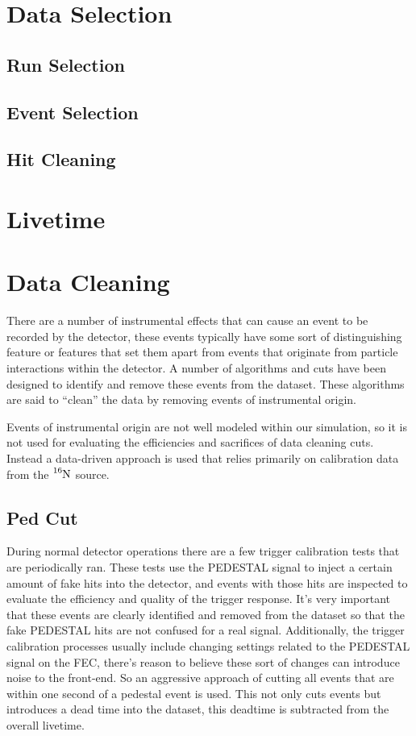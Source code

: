 \section{Data Selection}
\subsection{Run Selection}
\subsection{Event Selection}

\subsection{Hit Cleaning}

\section{Livetime}
\section{Data Cleaning}
There are a number of instrumental effects that can cause an event
to be recorded by the detector, these events typically have some
sort of distinguishing feature or features that set them apart
from events that originate from particle interactions within the
detector.
A number of algorithms and cuts have been designed to identify and remove
these events from the dataset.
These algorithms are said to ``clean'' the data by removing events
of instrumental origin.

Events of instrumental origin are not well modeled within our simulation,
so it is not used for evaluating the efficiencies and sacrifices of
data cleaning cuts.
Instead a data-driven approach is used that relies primarily on calibration
data from the $\ce{^{16}N}$ source.

\subsection{Ped Cut}
During normal detector operations there are a few trigger calibration
tests that are periodically ran.
These tests use the PEDESTAL signal to inject a certain amount of fake hits
into the detector, and events with those hits are inspected to evaluate the efficiency and
quality of the trigger response.
It's very important that these events are clearly identified and removed from the
dataset so that the fake PEDESTAL hits are not confused for a real signal.
Additionally, the trigger calibration processes usually include changing settings
related to the PEDESTAL signal on the FEC, there's reason to believe these sort
of changes can introduce noise to the front-end.
So an aggressive approach of cutting all events that are within one second of
a pedestal event is used.
This not only cuts events but introduces a dead time into the dataset,
this deadtime is subtracted from the overall livetime.
